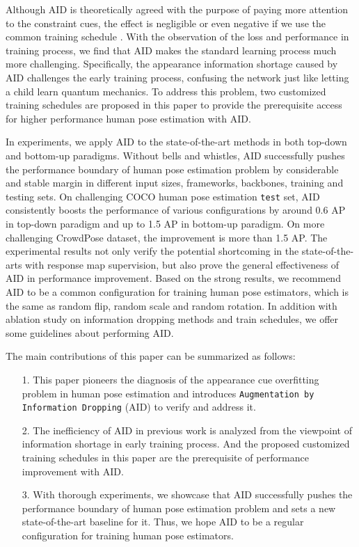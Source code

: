 \documentclass[final]{cvpr}
\begin{document}
Although AID is theoretically agreed with the purpose of paying more attention to the constraint cues, the effect is negligible or even negative if we use the common training schedule \cite{MSSAN,TAW}. With the observation of the loss and performance in training process, we find that AID makes the standard learning process much more challenging. Specifically, the appearance information shortage caused by AID challenges the early training process, confusing the network just like letting a child learn quantum mechanics. To address this problem, two customized training schedules are proposed in this paper to provide the prerequisite access for higher performance human pose estimation with AID.

In experiments, we apply AID to the state-of-the-art methods in both top-down and bottom-up paradigms. Without bells and whistles, AID successfully pushes the performance boundary of human pose estimation problem by considerable and stable margin in different input sizes, frameworks, backbones, training and testing sets. On challenging COCO \cite{COCO} human pose estimation \texttt{test} set, AID consistently boosts the performance of various configurations by around 0.6 AP in top-down paradigm and up to 1.5 AP in bottom-up paradigm. On more challenging CrowdPose \cite{Crowdpose} dataset, the improvement is more than 1.5 AP. The experimental results not only verify the potential shortcoming in the state-of-the-arts with response map supervision, but also prove the general effectiveness of AID in performance improvement. Based on the strong results, we recommend AID to be a common configuration for training human pose estimators, which is the same as random flip, random scale and random rotation. In addition with ablation study on information dropping methods and train schedules, we offer some guidelines about performing AID.




The main contributions of this paper can be summarized as follows:
\begin{itemize}
  \item [1.]
  This paper pioneers the diagnosis of the appearance cue overfitting problem in human pose estimation and introduces \texttt{Augmentation by Information Dropping} (AID) to verify and address it.
  \item [2.]
  The inefficiency of AID in previous work is analyzed from the viewpoint of information shortage in early training process. And the proposed customized training schedules in this paper are the prerequisite of performance improvement with AID.
  \item [3.]
  With thorough experiments, we showcase that AID successfully pushes the performance boundary of human pose estimation problem and sets a new state-of-the-art baseline for it. Thus, we hope AID to be a regular configuration for training human pose estimators.
\end{itemize}
\end{document}
